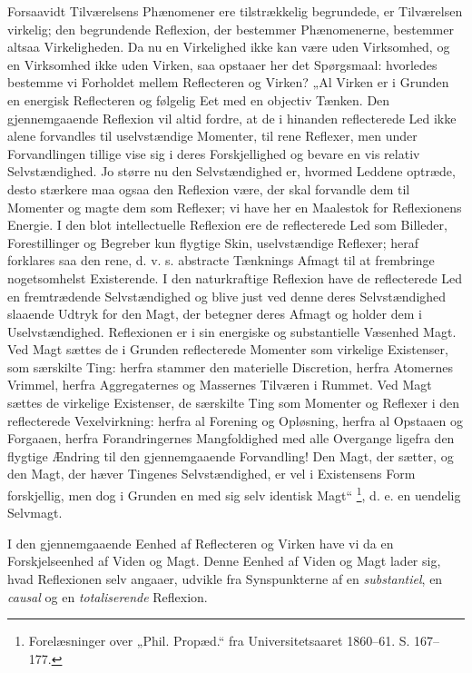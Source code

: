 \documentclass[11pt]{book}
\newcommand{\opage}[1]{\marginnote{\footnotesize\textit{[#1]}}}
\begin{document}
Forsaavidt Tilværelsens Phænomener ere tilstrækkelig begrundede, er
Tilværelsen virkelig; den begrundende Reflexion, der bestemmer
Phænomenerne, bestemmer altsaa Virkeligheden. Da nu en Virkelighed
ikke kan være uden Virksomhed, og en Virksomhed ikke uden Virken,
saa opstaaer her det Spørgsmaal: hvorledes bestemme vi Forholdet
mellem Reflecteren og Virken? „Al Virken er i Grunden en energisk
Reflecteren og følgelig Eet med en objectiv Tænken. Den
gjennemgaaende Reflexion vil altid fordre, at de i hinanden
reflecterede Led ikke alene forvandles til uselvstændige Momenter,
til rene Reflexer, men under Forvandlingen tillige vise sig i deres
Forskjellighed og bevare en vis relativ Selvstændighed. Jo større
nu den Selvstændighed er, hvormed Leddene optræde, desto stærkere
maa ogsaa den Reflexion være, der skal forvandle dem til Momenter
og magte dem som Reflexer; vi have her en Maalestok for
Reflexionens Energie. I den blot intellectuelle Reflexion ere de
reflecterede Led som Billeder, Forestillinger og Begreber kun
flygtige Skin, uselvstændige Reflexer; heraf forklares saa den
rene, d. v. s. abstracte Tænknings Afmagt til at frembringe
nogetsomhelst Existerende. I den naturkraftige Reflexion have de
reflecterede Led en fremtrædende Selvstændighed og blive just ved
denne deres Selvstændighed slaaende Udtryk for den Magt, der
betegner deres Afmagt og holder dem i Uselvstændighed. Reflexionen
er i sin energiske og substantielle Væsenhed Magt. Ved Magt sættes
de i Grunden reflecterede Momenter som virkelige Existenser, som
særskilte Ting: herfra stammer den materielle Discretion, herfra
Atomernes Vrimmel, herfra Aggregaternes og Massernes Tilværen i
Rummet. Ved Magt sættes de virkelige Existenser,
\opage{106} \setcounter{footnote}{0}%
de særskilte Ting som Momenter og Reflexer i den reflecterede
Vexelvirkning: herfra al Forening og Opløsning, herfra al Opstaaen
og Forgaaen, herfra Forandringernes Mangfoldighed med alle
Overgange ligefra den flygtige Ændring til den gjennemgaaende
Forvandling! Den Magt, der sætter, og den Magt, der hæver Tingenes
Selvstændighed, er vel i Existensens Form forskjellig, men dog i
Grunden en med sig selv identisk Magt“%
\footnote{Forelæsninger over „Phil. Propæd.“ fra Universitetsaaret
1860--61. S. 167--177.}, d. e. en uendelig Selvmagt.

I den gjennemgaaende Eenhed af Reflecteren og Virken have vi da en
Forskjelseenhed af Viden og Magt. Denne Eenhed af Viden og Magt
lader sig, hvad Reflexionen selv angaaer, udvikle fra
Synspunkterne af en \emph{substantiel}, en \emph{causal} og en
\emph{totaliserende} Reflexion.
\end{document}
